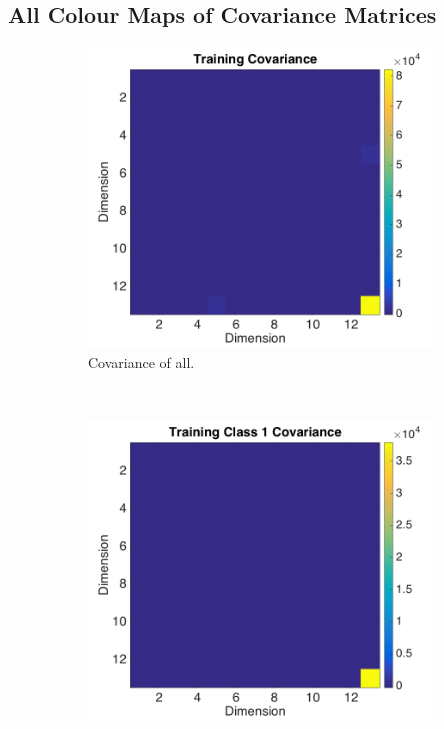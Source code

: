 \documentclass[a4paper, 10pt, conference]{ieeeconf}
\begin{document}
\subsection*{All Colour Maps of Covariance Matrices}
\begin{figure}[!ht]
  \captionsetup[subfigure]{position=b}
  \centering
    \begin{subfigure}{0.45\textwidth}
      \includegraphics[width=\textwidth]{pic/covtraining.png}
      \caption{Covariance of all.}
      \label{fig:covtraining}
    \end{subfigure}
    ~
    \begin{subfigure}{0.45\textwidth}
      \includegraphics[width=\textwidth]{pic/covclass1.png}

\end{subfigure}
\end{figure}
\end{document}
